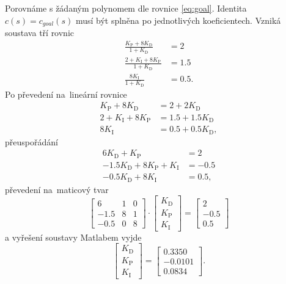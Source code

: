 \documentclass[twoside]{article}
\begin{document}
Porovnáme s žádaným polynomem dle rovnice \eqref{eq:goal}. Identita $c(s) = c_{goal}(s)$ musí být splněna po jednotlivých koeficientech.
Vzniká soustava tří rovnic
\begin{equation}
	\begin{split}
		\frac{K_\text{P} + 8K_\text{D}}{1 + K_\text{D}} &= 2 \\
		\frac{2 + K_\text{I} + 8K_\text{P}}{1 + K_\text{D}} &= 1.5\\
		\frac{8K_\text{I}}{1 + K_\text{D}} &= 0.5.
	\end{split}
\end{equation}
Po převedení na~lineární rovnice
\begin{equation}
	\begin{split}
		K_\text{P} + 8K_\text{D} &= 2 + 2K_\text{D} \\
		2 + K_\text{I} + 8K_\text{P} &= 1.5 + 1.5 K_\text{D}\\
		8K_\text{I} &= 0.5 +0.5 K_\text{D},
	\end{split}
\end{equation}
přeuspořádání
\begin{equation}
	\begin{split}
		6K_\text{D} + K_\text{P} &= 2 \\
		- 1.5 K_\text{D} + 8K_\text{P}  + K_\text{I} &= -0.5\\
		- 0.5K_\text{D} + 8K_\text{I} &= 0.5,
	\end{split}
\end{equation}
převedení na~maticový tvar
\begin{equation}
	\begin{bmatrix}
		6 & 1 & 0 \\
		-1.5 & 8 & 1 \\
		-0.5 & 0 &8  
		
	\end{bmatrix} \cdot \begin{bmatrix}
		K_\text{D} \\
		K_\text{P} \\
		K_\text{I}
	\end{bmatrix} = \begin{bmatrix}
		2 \\
		-0.5 \\
		0.5
	\end{bmatrix}
\end{equation}
a vyřešení soustavy Matlabem vyjde 
\begin{equation}
	\begin{bmatrix}
		K_\text{D} \\
		K_\text{P} \\
		K_\text{I}
	\end{bmatrix} = 
	\begin{bmatrix}
		0.3350 \\
		-0.0101 \\
		0.0834
	\end{bmatrix}.
\end{equation} \\
\end{document}
